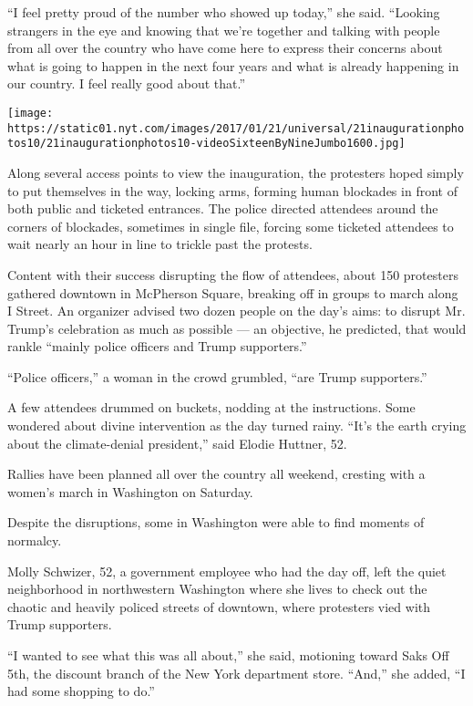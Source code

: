 ``I feel pretty proud of the number who showed up today,'' she said.
``Looking strangers in the eye and knowing that we're together and
talking with people from all over the country who have come here to
express their concerns about what is going to happen in the next four
years and what is already happening in our country. I feel really good
about that.''

\texttt{[image: https://static01.nyt.com/images/2017/01/21/universal/21inaugurationphotos10/21inaugurationphotos10-videoSixteenByNineJumbo1600.jpg]}

Along several access points to view the inauguration, the protesters
hoped simply to put themselves in the way, locking arms, forming human
blockades in front of both public and ticketed entrances. The police
directed attendees around the corners of blockades, sometimes in single
file, forcing some ticketed attendees to wait nearly an hour in line to
trickle past the protests.

Content with their success disrupting the flow of attendees, about 150
protesters gathered downtown in McPherson Square, breaking off in groups
to march along I Street. An organizer advised two dozen people on the
day's aims: to disrupt Mr. Trump's celebration as much as possible ---
an objective, he predicted, that would rankle ``mainly police officers
and Trump supporters.''

``Police officers,'' a woman in the crowd grumbled, ``are Trump
supporters.''

A few attendees drummed on buckets, nodding at the instructions. Some
wondered about divine intervention as the day turned rainy. ``It's the
earth crying about the climate-denial president,'' said Elodie Huttner,
52.

Rallies have been planned all over the country all weekend, cresting
with a women's march in Washington on Saturday.

Despite the disruptions, some in Washington were able to find moments of
normalcy.

Molly Schwizer, 52, a government employee who had the day off, left the
quiet neighborhood in northwestern Washington where she lives to check
out the chaotic and heavily policed streets of downtown, where
protesters vied with Trump supporters.

``I wanted to see what this was all about,'' she said, motioning toward
Saks Off 5th, the discount branch of the New York department store.
``And,'' she added, ``I had some shopping to do.''

